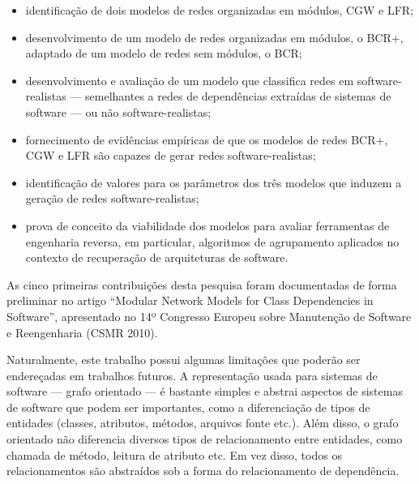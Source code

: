 \begin{itemize}
	\item identificação de dois modelos de redes organizadas em módulos, CGW e LFR;
	\item desenvolvimento de um modelo de redes organizadas em módulos, o BCR+, adaptado de um modelo de redes sem módulos, o BCR;
	\item desenvolvimento e avaliação de um modelo que classifica redes em software-realistas --- semelhantes a redes de dependências extraídas de sistemas de software --- ou não software-realistas;
	\item fornecimento de evidências empíricas de que os modelos de redes BCR+, CGW e LFR são capazes de gerar redes software-realistas;
	\item identificação de valores para os parâmetros dos três modelos que induzem a geração de redes software-realistas;
	\item prova de conceito da viabilidade dos modelos para avaliar ferramentas de engenharia reversa, em particular, algoritmos de agrupamento aplicados no contexto de recuperação de arquiteturas de software. 
\end{itemize}

As cinco primeiras contribuições desta pesquisa foram documentadas de forma preliminar no artigo ``Modular Network Models for Class Dependencies in Software'', apresentado no 14º Congresso Europeu sobre Manutenção de Software e Reengenharia (CSMR 2010). 


Naturalmente, este trabalho possui algumas limitações que poderão ser endereçadas em trabalhos futuros. A representação usada para sistemas de software --- grafo orientado --- é bastante simples e abstrai aspectos de sistemas de software que podem ser importantes, como a diferenciação de tipos de entidades (classes, atributos, métodos, arquivos fonte etc.). Além disso, o grafo orientado não diferencia diversos tipos de relacionamento entre entidades, como chamada de método, leitura de atributo etc. Em vez disso, todos os relacionamentos são abstraídos sob a forma do relacionamento de dependência.

